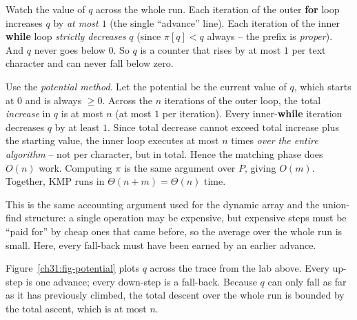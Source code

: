 \begin{focusbox}
Watch the value of $q$ across the whole run. Each iteration of the outer
\textbf{for} loop increases $q$ by \emph{at most $1$} (the single ``advance''
line). Each iteration of the inner \textbf{while} loop \emph{strictly decreases}
$q$ (since $\pi[q] < q$ always -- the prefix is \emph{proper}). And $q$ never
goes below $0$. So $q$ is a counter that rises by at most $1$ per text character
and can never fall below zero.
\end{focusbox}

\begin{formalbox}
Use the \emph{potential method}. Let the potential be the current value of $q$,
which starts at $0$ and is always $\ge 0$. Across the $n$ iterations of the outer
loop, the total \emph{increase} in $q$ is at most $n$ (at most $1$ per
iteration). Every inner-\textbf{while} iteration decreases $q$ by at least $1$.
Since total decrease cannot exceed total increase plus the starting value, the
inner loop executes at most $n$ times \emph{over the entire algorithm} -- not
per character, but in total. Hence the matching phase does $O(n)$ work. Computing
$\pi$ is the same argument over $P$, giving $O(m)$. Together, KMP runs in
$\Theta(n + m) = \Theta(n)$ time.
\end{formalbox}

This is the same accounting argument used for the dynamic array and the
union-find structure: a single operation may be expensive, but expensive steps must be
``paid for'' by cheap ones that came before, so the average over the whole run is
small. Here, every fall-back must have been earned by an earlier advance.

Figure~\ref{ch31:fig-potential} plots $q$ across the trace from the lab above.
Every up-step is one advance; every down-step is a fall-back. Because $q$ can
only fall as far as it has previously climbed, the total descent over the whole
run is bounded by the total ascent, which is at most $n$.

